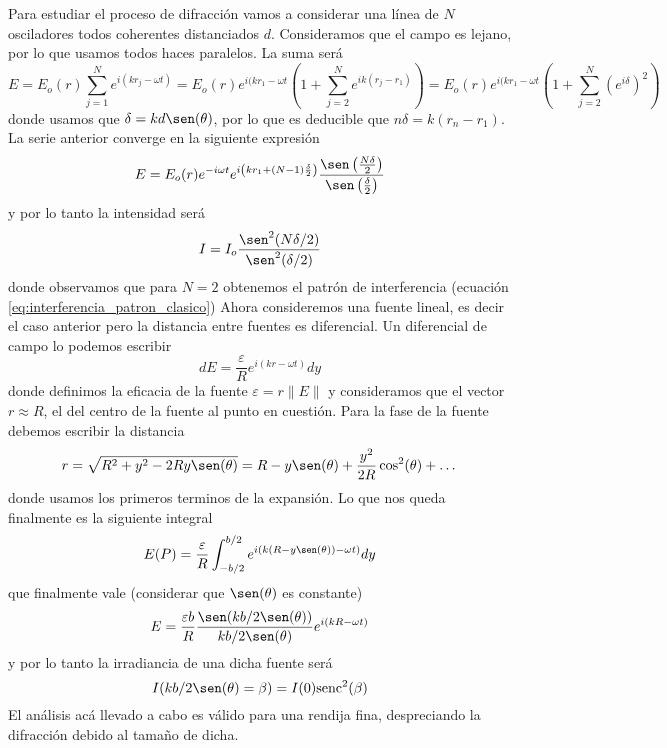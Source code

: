 \documentclass[a4paper,spanish]{article}
\numberwithin{equation}{section}
\begin{document}
	Para estudiar el proceso de difracci\'on vamos a considerar una l\'inea de $N$ osciladores todos coherentes distanciados $d$. Consideramos que el campo es lejano, por lo que usamos todos haces paralelos. La suma ser\'a
	\[E = E_o(r) \sum_{j = 1}^{N} e^{i(k r_j - \omega t)} = E_o(r) e^{i(k r_1 - \omega t} \left(1 + \sum_{j = 2}^N e^{i k (r_j - r_1)}\right) = E_o(r) e^{i(k r_1 - \omega t} \left(1 + \sum_{j = 2}^N \left(e^{i \delta}\right)^2\right)\] donde usamos que $\delta = k d \sen(\theta)$, por lo que es deducible que $n \delta = k(r_n - r_1)$. La serie anterior converge en la siguiente expresi\'on \[E = E_o(r)e^{-i \omega t} e^{i \left(k r_1 + (N -1)\frac{\delta}{2}\right)}\frac{\sen\left(\frac{N \delta}{2}\right)}{\sen\left(\frac{\delta}{2}\right)}\] y por lo tanto la intensidad ser\'a \[I = I_o \frac{\sen^2(N\delta/2)}{\sen^2(\delta/2)}\] donde observamos que para $N = 2$ obtenemos el patr\'on de interferencia (ecuaci\'on \ref{eq:interferencia_patron_clasico})
	Ahora consideremos una fuente lineal, es decir el caso anterior pero la distancia entre fuentes es diferencial. Un diferencial de campo lo podemos escribir \[dE = \frac{\varepsilon}{R} e^{i(k r - \omega t)} dy\] donde definimos la eficacia de la fuente $\varepsilon = r \|E\|$ y consideramos que el vector $r \approx R$, el del centro de la fuente al punto en cuesti\'on. Para la fase de la fuente debemos escribir la distancia \[r = \sqrt{R^2 + y^2 - 2 R y \sen(\theta)} = R - y\sen(\theta) + \frac{y^2}{2R} \cos^2(\theta) + \dots\] donde usamos los primeros terminos de la expansi\'on. Lo que nos queda finalmente es la siguiente integral \[ E(P) = \frac{\varepsilon}{R} \int_{-b/2}^{b/2} e^{i(k (R - y\sen(\theta)) - \omega t)} dy\] que finalmente vale (considerar que $\sen(\theta)$ es constante)
	\begin{equation}
		E = \frac{\varepsilon b}{R} \frac{\sen(k b / 2 \sen(\theta))}{k b / 2 \sen(\theta)} e^{i (k R - \omega t)}
		\label{eq:difraccion_campo_ranura}
	\end{equation}
	y por lo tanto la irradiancia de una dicha fuente ser\'a
	\begin{equation}
		I(k b / 2 \sen(\theta) = \beta) = I(0) \text{senc}^2(\beta)
		\label{eq:difraccion_ranura}
	\end{equation}
	El an\'alisis ac\'a llevado a cabo es v\'alido para una rendija fina, despreciando la difracci\'on debido al tama\~no de dicha. 
	
\end{document}
